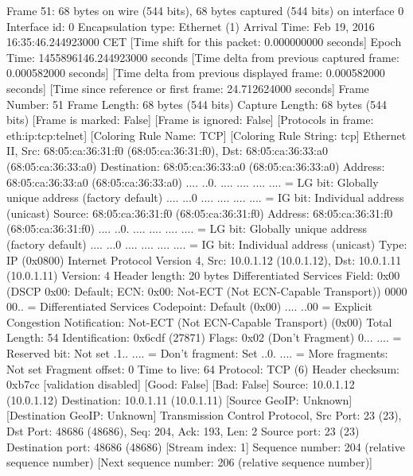 Frame 51: 68 bytes on wire (544 bits), 68 bytes captured (544 bits) on interface 0
    Interface id: 0
    Encapsulation type: Ethernet (1)
    Arrival Time: Feb 19, 2016 16:35:46.244923000 CET
    [Time shift for this packet: 0.000000000 seconds]
    Epoch Time: 1455896146.244923000 seconds
    [Time delta from previous captured frame: 0.000582000 seconds]
    [Time delta from previous displayed frame: 0.000582000 seconds]
    [Time since reference or first frame: 24.712624000 seconds]
    Frame Number: 51
    Frame Length: 68 bytes (544 bits)
    Capture Length: 68 bytes (544 bits)
    [Frame is marked: False]
    [Frame is ignored: False]
    [Protocols in frame: eth:ip:tcp:telnet]
    [Coloring Rule Name: TCP]
    [Coloring Rule String: tcp]
Ethernet II, Src: 68:05:ca:36:31:f0 (68:05:ca:36:31:f0), Dst: 68:05:ca:36:33:a0 (68:05:ca:36:33:a0)
    Destination: 68:05:ca:36:33:a0 (68:05:ca:36:33:a0)
        Address: 68:05:ca:36:33:a0 (68:05:ca:36:33:a0)
        .... ..0. .... .... .... .... = LG bit: Globally unique address (factory default)
        .... ...0 .... .... .... .... = IG bit: Individual address (unicast)
    Source: 68:05:ca:36:31:f0 (68:05:ca:36:31:f0)
        Address: 68:05:ca:36:31:f0 (68:05:ca:36:31:f0)
        .... ..0. .... .... .... .... = LG bit: Globally unique address (factory default)
        .... ...0 .... .... .... .... = IG bit: Individual address (unicast)
    Type: IP (0x0800)
Internet Protocol Version 4, Src: 10.0.1.12 (10.0.1.12), Dst: 10.0.1.11 (10.0.1.11)
    Version: 4
    Header length: 20 bytes
    Differentiated Services Field: 0x00 (DSCP 0x00: Default; ECN: 0x00: Not-ECT (Not ECN-Capable Transport))
        0000 00.. = Differentiated Services Codepoint: Default (0x00)
        .... ..00 = Explicit Congestion Notification: Not-ECT (Not ECN-Capable Transport) (0x00)
    Total Length: 54
    Identification: 0x6cdf (27871)
    Flags: 0x02 (Don't Fragment)
        0... .... = Reserved bit: Not set
        .1.. .... = Don't fragment: Set
        ..0. .... = More fragments: Not set
    Fragment offset: 0
    Time to live: 64
    Protocol: TCP (6)
    Header checksum: 0xb7cc [validation disabled]
        [Good: False]
        [Bad: False]
    Source: 10.0.1.12 (10.0.1.12)
    Destination: 10.0.1.11 (10.0.1.11)
    [Source GeoIP: Unknown]
    [Destination GeoIP: Unknown]
Transmission Control Protocol, Src Port: 23 (23), Dst Port: 48686 (48686), Seq: 204, Ack: 193, Len: 2
    Source port: 23 (23)
    Destination port: 48686 (48686)
    [Stream index: 1]
    Sequence number: 204    (relative sequence number)
    [Next sequence number: 206    (relative sequence number)]
